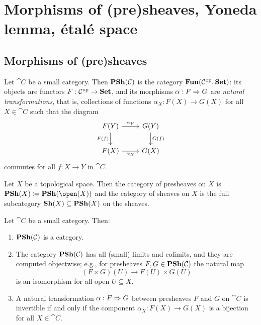 \chapter{Morphisms of (pre)sheaves, Yoneda lemma, étalé space}


\section{Morphisms of (pre)sheaves}

\begin{defn}
Let $\cat C$ be a small category.
Then $\operatorname{\mathbf{PSh}}(\mathcal{C})$ is the category $\operatorname{\mathbf{Fun}}(\mathcal{C}^{\mathrm{op}},\mathbf{Set})$: its objects are functors $F\colon\cat C\opp\to\catSet$, and its morphisms $\alpha\colon F\To G$ are \emph{natural transformations}, that is, collections of functions $\alpha_X\colon F(X)\to G(X)$ for all $X\in\cat C$ such that the diagram
\begin{equation*}
    \begin{tikzcd}
        F(Y) \ar[r, "\alpha_Y"] \ar[d, "F(f)"'] & G(Y) \ar[d, "G(f)"] \\
        F(X) \ar[r, "\alpha_X"'] & G(X)
    \end{tikzcd}
\end{equation*}
commutes for all $f\colon X\to Y$ in $\cat C$.
\end{defn}

\begin{defn}
Let $X$ be a topological space.
Then the category of presheaves on $X$ is $\catPresheaf(X)\coloneqq\catPresheaf(\open(X))$ and the category of sheaves on $X$ is the full subcategory $\operatorname{\mathbf{Sh}}(X)\subseteq\operatorname{\mathbf{PSh}}(X)$ on the sheaves.
\end{defn}

\begin{lem}\label{lem:psh-category-set}
Let $\cat C$ be a small category.
Then:
\begin{enumerate}
\item $\operatorname{\mathbf{PSh}}(\mathcal{C})$ is a category.
\item The category $\operatorname{\mathbf{PSh}}(\mathcal{C})$ has all (small) limits and colimits, and they are computed objectwise; e.g., for presheaves $F,G\in\operatorname{\mathbf{PSh}}(\mathcal{C})$ the natural map
    \[ (F\times G)(U) \to F(U)\times G(U) \]
    is an isomorphism for all open $U\subseteq X$.
\item A natural transformation $\alpha\colon F\To G$ between presheaves $F$ and $G$ on $\cat C$ is invertible if and only if the component $\alpha_X\colon F(X)\to G(X)$ is a bijection for all $X\in\cat C$.
\end{enumerate}
\end{lem}

